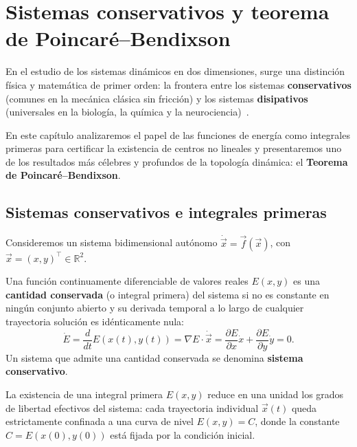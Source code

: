 \section{Sistemas conservativos y teorema de Poincaré--Bendixson}
\label{sec:conservativos}

En el estudio de los sistemas dinámicos en dos dimensiones, surge una distinción física y matemática de primer orden: la frontera entre los sistemas \textbf{conservativos} (comunes en la mecánica clásica sin fricción) y los sistemas \textbf{disipativos} (universales en la biología, la química y la neurociencia)~\cite{strogatz2015,murray2002}.

En este capítulo analizaremos el papel de las funciones de energía como integrales primeras para certificar la existencia de centros no lineales y presentaremos uno de los resultados más célebres y profundos de la topología dinámica: el \textbf{Teorema de Poincaré--Bendixson}.

\subsection{Sistemas conservativos e integrales primeras}

Consideremos un sistema bidimensional autónomo $\dot{\vec{x}} = \vec{f}(\vec{x})$, con $\vec{x} = (x,y)^\top \in \mathbb{R}^2$.

\begin{definition}
Una función continuamente diferenciable de valores reales $E(x,y)$ es una \textbf{cantidad conservada} (o integral primera) del sistema si no es constante en ningún conjunto abierto y su derivada temporal a lo largo de cualquier trayectoria solución es idénticamente nula:
\begin{equation}
    \dot{E} = \frac{d}{dt}E(x(t), y(t)) = \nabla E \cdot \dot{\vec{x}} = \frac{\partial E}{\partial x} \dot{x} + \frac{\partial E}{\partial y} \dot{y} = 0.
    \label{eq:derivada_energia_cero}
\end{equation}
Un sistema que admite una cantidad conservada se denomina \textbf{sistema conservativo}.
\end{definition}

La existencia de una integral primera $E(x,y)$ reduce en una unidad los grados de libertad efectivos del sistema: cada trayectoria individual $\vec{x}(t)$ queda estrictamente confinada a una curva de nivel $E(x,y) = C$, donde la constante $C = E(x(0), y(0))$ está fijada por la condición inicial.

